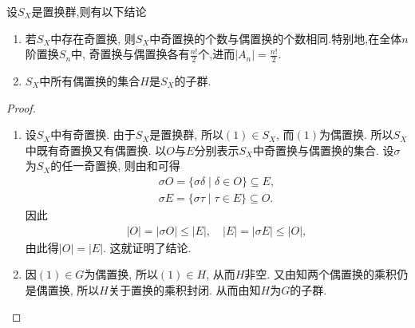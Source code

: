 \documentclass[../../main.tex]{subfiles}%
\begin{document}
\begin{theorem}\label{theorem:全体奇偶置换构成的集合的阶}
设$S_X$是置换群,则有以下结论
\begin{enumerate}[(1)]
\item\label{theorem:全体奇偶置换构成的集合的阶-1} 若$S_X$中存在奇置换, 则$S_X$中奇置换的个数与偶置换的个数相同.特别地,在全体$n$阶置换$S_n$中, 奇置换与偶置换各有$\frac{n!}{2}$个,进而$|A_n|=\frac{n!}{2}.$

\item\label{theorem:全体奇偶置换构成的集合的阶-2} $S_X$中所有偶置换的集合$H$是$S_X$的子群.
\end{enumerate}
\end{theorem}
\begin{proof}
\begin{enumerate}[(1)]
\item 设$S_X$中有奇置换. 由于$S_X$是置换群, 所以$(1) \in S_X$, 而$(1)$为偶置换. 所以$S_X$中既有奇置换又有偶置换. 以$O$与$E$分别表示$S_X$中奇置换与偶置换的集合. 设$\sigma$为$S_X$的任一奇置换, 则由和可得
\begin{align*}
\sigma O = \{\sigma\delta \mid \delta \in O\} \subseteq E, \\
\sigma E = \{\sigma\tau \mid \tau \in E\} \subseteq O.
\end{align*}
因此
\begin{align*}
|O| = |\sigma O| \leqslant |E|, \quad |E| = |\sigma E| \leqslant |O|,
\end{align*}
由此得$|O| = |E|$. 这就证明了结论.

\item 因$(1) \in G$为偶置换, 所以$(1) \in H$, 从而$H$非空. 又由知两个偶置换的乘积仍是偶置换, 所以$H$关于置换的乘积封闭. 从而由知$H$为$G$的子群.
\end{enumerate}

\end{proof}
\end{document}
